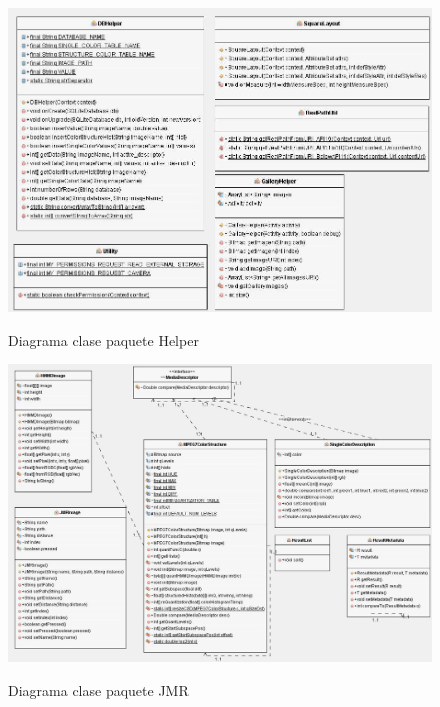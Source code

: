 \begin{figure}[H] %
\centering
\includegraphics[scale=0.6]{imagenes/diagrama4.jpg}  %
\label{diagrama4}
\caption{Diagrama clase paquete Helper}
\end{figure}

\begin{figure}[H] %
\centering
\includegraphics[scale=0.6]{imagenes/diagrama5.jpg}  %
\label{diagrama5}
\caption{Diagrama clase paquete JMR}
\end{figure}


